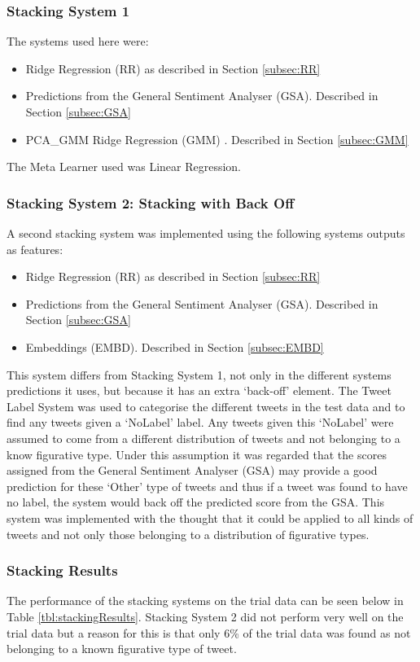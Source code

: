 \documentclass[11pt,letterpaper]{article}
\begin{document}
\subsubsection{Stacking System 1}
\label{subsubsec:stacking1}
The systems used here were: 
\begin{itemize}
 \item Ridge Regression (RR) as described in Section \ref{subsec:RR} 
 \item Predictions from the General Sentiment Analyser (GSA). Described in Section \ref{subsec:GSA}
\item PCA\_GMM Ridge Regression (GMM) . Described in Section \ref{subsec:GMM}
 \end{itemize}

The Meta Learner used was Linear Regression.

\subsubsection{Stacking System 2: Stacking with Back Off}
\label{subsubsec:stacking2}
A second stacking system was implemented using the following systems outputs as features:
\begin{itemize}
 \item Ridge Regression (RR) as described in Section \ref{subsec:RR} 
 \item Predictions from the General Sentiment Analyser (GSA). Described in Section \ref{subsec:GSA}
\item Embeddings (EMBD). Described in Section \ref{subsec:EMBD}
 \end{itemize}
This system differs from Stacking System 1, not only in the different systems predictions it uses, but because it has an extra `back-off' element. The Tweet Label System was used to categorise the different tweets in the test data and to find any tweets given a `NoLabel' label. Any tweets given this `NoLabel' were assumed to come from a different distribution of tweets and not belonging to a know figurative type. Under this assumption it was regarded that the scores assigned from the General Sentiment Analyser (GSA) may provide a good prediction for these `Other' type of tweets and thus if a tweet was found to have no label, the system would back off the predicted score from the GSA.
This system was implemented with the thought that it could be applied to all kinds of tweets and not only those belonging to a distribution of figurative types. 

\subsubsection{Stacking Results}
The performance of the stacking systems on the trial data can be seen below in Table \ref{tbl:stackingResults}. Stacking System 2 did not perform very well on the trial data but a reason for this is that only 6\% of the trial data was found as not belonging to a known figurative type of tweet.
\end{document}
